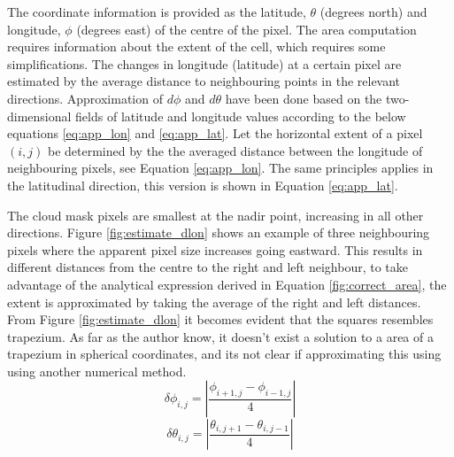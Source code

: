 The coordinate information is provided as the latitude, $\theta$ (degrees north) and longitude, $\phi$ (degrees east) of the centre of the pixel. The area computation requires information about the extent of the cell, which requires some simplifications. The changes in longitude (latitude) at a certain pixel are estimated by the average distance to neighbouring points in the relevant directions. Approximation of $d\phi$ and $d\theta$ have been done based on the two-dimensional fields of latitude and longitude values according to the below equations \eqref{eq:app_lon} and  \eqref{eq:app_lat}. Let the horizontal extent of a pixel $(i,j)$ be determined by the the averaged distance between the longitude of neighbouring pixels, see Equation \eqref{eq:app_lon}. The same principles applies in the latitudinal direction, this version is shown in Equation \ref{eq:app_lat}.


The cloud mask pixels are smallest at the nadir point, increasing in all other directions. Figure \ref{fig:estimate_dlon} shows an example of three neighbouring pixels where the apparent pixel size increases going eastward. This results in different distances from the centre to the right and left neighbour, to take advantage of the analytical expression derived in Equation \ref{fig:correct_area}, the extent is approximated by taking the average of the right and left distances. From Figure \ref{fig:estimate_dlon} it becomes evident that the squares resembles trapezium. As far as the author know, it doesn't exist a solution to a area of a trapezium in spherical coordinates, and its not clear if approximating this using using another numerical method.
\begin{equation} \label{eq:app_lon}
    \delta \phi_{i,j} = \left| \frac{\phi_{i+1,j} - \phi_{i-1, j}}{4} \right|
\end{equation}
\begin{equation} \label{eq:app_lat}
    \delta \theta_{i,j} = \left| \frac{\theta_{i,j+1} - \theta_{i, j-1}}{4} \right|
\end{equation}


